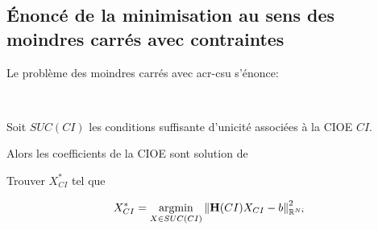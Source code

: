 \subsection{Énoncé de la minimisation au sens des moindres carrés avec contraintes}
  Le problème des moindres carrés avec \gls{acr-csu} s'énonce:

  \begin{prop}
  ~

  Soit \(SUC(CI)\) les conditions suffisante d'unicité associées à la CIOE \(CI\). 

  Alors les coefficients de la CIOE sont solution de 

  Trouver \(X_{CI}^*\) tel que

  \[
    X_{CI}^* = {\underset{X \in SUC(CI)}{\operatorname{argmin}}} \left\lVert {\mathbf{H}}(CI)X_{CI} - {b}\right\rVert^2_{\mathbb R^{Ni}}
  \]
  \end{prop}
